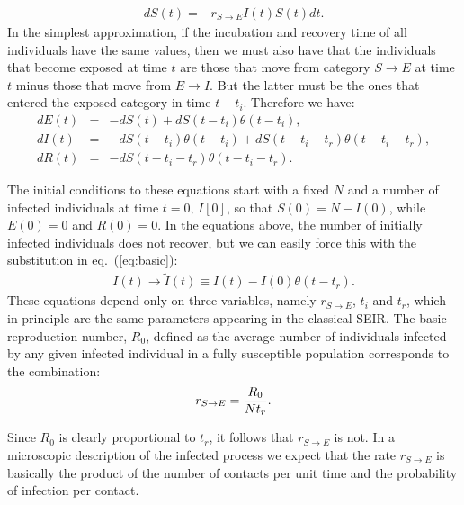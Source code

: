 \documentclass[a4paper,oneside,11pt]{article}
\begin{document}
\begin{eqnarray}
d S(t) = - r_{S\rightarrow E} I(t) S(t) dt.
\label{eq:basic}
\end{eqnarray}
In the simplest approximation, if the incubation and recovery time of all individuals have the same values, then we must also have that the individuals that become exposed at time 
$t$ are those that move from category $S\rightarrow E$ at time $t$ minus those that move from $E\rightarrow I$. But the latter must be the ones that entered the exposed category in time $t-t_i$. Therefore we have:
\begin{eqnarray}
d E(t) &=& -d S(t) + d S(t-t_i) \theta(t-t_i) ,\nonumber\\
d I(t) &=& -d S(t-t_i) \theta(t-t_i)+ d S(t-t_i-t_r) \theta(t-t_i-t_r),\nonumber\\
d R(t) &=& - d S(t - t_i - t_r) \theta(t-t_i-t_r).\nonumber
\label{eqs:cor}
\end{eqnarray}

The initial conditions to these equations start with a fixed $N$ and a number of infected individuals at time $t=0$, $I[0]$, so that $S(0) = N-I(0)$, while $E(0)=0$ and $R(0)=0$.  
In the  equations above, the number of initially infected individuals does not recover, but we can easily force this with the substitution in eq.~(\ref{eq:basic}):
\begin{eqnarray}
I(t) \rightarrow \tilde{I}(t) \equiv I(t) - I(0) \theta(t-t_r).
\end{eqnarray}
These equations depend only on three variables, namely $r_{S\rightarrow E}$, $t_i$ and $t_r$, which in principle are the same parameters appearing in the classical SEIR.
The basic reproduction number, $R_0$, defined as the average number of individuals infected by any given infected individual in a fully susceptible population corresponds to the combination:
\begin{eqnarray}
r_{S\rightarrow E} = {R_0\over N t_r}. 
\end{eqnarray}

Since $R_0$ is clearly proportional to $t_r$, it follows that $r_{S\rightarrow E}$ is not. In a microscopic description of the infected process we expect that the rate $r_{S\rightarrow E}$ is basically the product of the number of contacts per unit time and the probability of infection per contact. 
\end{document}
